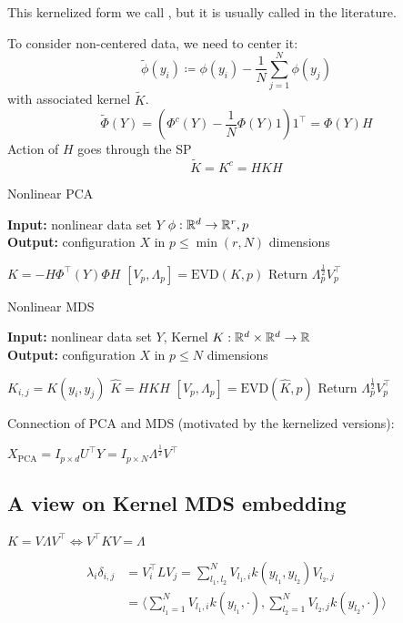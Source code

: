 This kernelized form we call , but it is usually called 
 in the literature. 

To consider non-centered data, we need to center it: 
\[\tilde{\phi}(y_i)\coloneqq \phi(y_i)-\frac{1}{N}\sum_{j=1}^N\phi(y_j)\]
with associated kernel $\tilde{K}$.
\[\tilde{\Phi}(Y)=(\Phi^c(Y)-\frac{1}{N}\Phi(Y)1)1^\intercal = \Phi(Y)H\]
Action of $H$ goes through the SP 
\[\tilde{K}=K^c=HKH\]
\begin{algorithm}[H] 
    \caption{Nonlinear PCA}\label{alg:nl_pca}
 \textbf{Input:}  nonlinear data set $Y$ $\phi:\mathbb{R}^d\to\mathbb{R}^r,p$\\
 \textbf{Output:} configuration $X$ in $p\leq \min(r,N)$ dimensions
 \begin{algorithmic}
   \State $K=-H\Phi^\intercal(Y)\Phi H$
   \State $[V_p,\Lambda_p]=\text{EVD}(K,p)$
   \State Return $\Lambda_p^{\frac{1}{2}} V_p^\intercal$
 \end{algorithmic}
\end{algorithm}

\begin{algorithm}[H] 
    \caption{Nonlinear MDS}\label{alg:nl_mds}
 \textbf{Input:}  nonlinear data set $Y$, Kernel $K:\mathbb{R}^d\times\mathbb{R}^d\to\mathbb{R}$\\
 \textbf{Output:} configuration $X$ in $p\leq N$ dimensions
 \begin{algorithmic}
   \State $K_{i,j}=K(y_i,y_j)$
   \State $\hat{K}=HKH$
   \State $[V_p,\Lambda_p]=\text{EVD}(\hat{K},p)$
   \State Return $\Lambda_p^{\frac{1}{2}} V_p^\intercal$
 \end{algorithmic}
\end{algorithm}


Connection of PCA and MDS (motivated by the kernelized versions):

$X_{\text{PCA}}=I_{p\times d} U^\intercal Y=I_{p\times N}\Lambda^{\frac{1}{2}}V^\intercal$

\subsection{A view on Kernel MDS embedding}

$K=V\Lambda V^\intercal\iff V^\intercal K V = \Lambda$

\begin{align*}
    \lambda_i \delta_{i,j}&=V_i^\intercal L V_j=\sum_{l_1,l_2}^N V_{l_1,i} k(y_{l_1},y_{l_2}) V_{l_2,j}\\
    &=\langle \sum_{l_1=1}^N V_{l_1,i} k (y_{l_1},\cdot),\sum_{l_2=1}^{N} V_{l_2,j} k(y_{l_2},\cdot)\rangle
\end{align*}

